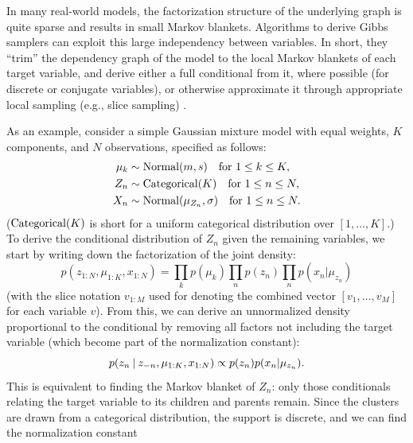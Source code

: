 In many real-world models, the factorization structure of the underlying graph is quite sparse and
results in small Markov blankets.  Algorithms to derive Gibbs samplers can exploit this large
independency between variables.  In short, they \enquote{trim} the dependency graph of the model to
the local Markov blankets of each target variable, and derive either a full conditional from it,
where possible (for discrete or conjugate variables), or otherwise approximate it through
appropriate local sampling (e.g., slice sampling) \parencite[see][]{plummer2003jags}.

As an example, consider a simple Gaussian mixture model with equal weights, \(K\) components, and
\(N\) observations, specified as follows:
\begin{equation}
  \label{eq:normal-mixture-1}
  \begin{aligned}
    \mu_{k} &\sim \mathrm{Normal}(m, s) \quad\text{for } 1 \le k \le K, \\
    Z_{n} &\sim \mathrm{Categorical}(K) \quad\text{for } 1 \le n \le N, \\
    X_{n} &\sim \mathrm{Normal}(\mu_{Z_{n}}, \sigma) \quad\text{for } 1 \le n \le N.
  \end{aligned}
\end{equation}
(\(\mathrm{Categorical}(K)\) is short for a uniform categorical distribution over
\([1, \ldots, K]\).)  To derive the conditional distribution of \(Z_{n}\) given the remaining
variables, we start by writing down the factorization of the joint density:
\begin{equation}
  p(z_{1:N}, \mu_{1:K}, x_{1:N}) = \prod_{k} p(\mu_{k}) \prod_{n} p(z_{n}) \prod_{n} p(x_{n} | \mu_{z_{n}})
\end{equation}
(with the slice notation \(v_{1:M}\) used for denoting the combined vector \([v_1, \ldots, v_M]\)
for each variable \(v\)). From this, we can derive an unnormalized density proportional to the
conditional by removing all factors not including the target variable (which become part of the
normalization constant):
\begin{equation}
    p(z_{n} \:\vert\: z_{-n}, \mu_{1:K}, x_{1:N}) \propto p(z_{n}) p(x_{n} | \mu_{z_{n}}).
\end{equation}
This is equivalent to finding the Markov blanket \parencites[section
24.2]{murphy2012machine}[section 4.5]{koller2009probabilistic} of \(Z_{n}\): only those conditionals
relating the target variable to its children and parents remain.  Since the clusters are drawn from
a categorical distribution, the support is discrete, and we can find the normalization constant
